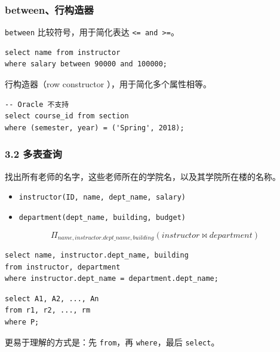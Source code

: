 \documentclass[aspectratio=169, 14pt]{beamer}
\begin{document}
\begin{frame}[fragile]
    \frametitle{between、行构造器}
    \texttt{between} 比较符号，用于简化表达 \texttt{<= and >=}。
\begin{verbatim}    
select name from instructor
where salary between 90000 and 100000;
\end{verbatim}
\pause
行构造器（row constructor ），用于简化多个属性相等。
\begin{verbatim}    
-- Oracle 不支持
select course_id from section
where (semester, year) = ('Spring', 2018);
\end{verbatim}

\end{frame}

\begin{frame}[fragile]
    \frametitle{3.2 多表查询}
    找出所有老师的名字，这些老师所在的学院名，以及其学院所在楼的名称。
\begin{itemize}
    \item  \texttt{instructor(ID, name, dept\_name, salary)}
    \item \texttt{department(dept\_name, building, budget)}
\end{itemize}
\[\Pi_{name, instructor.dept\_name, building}(instructor \Join department)\]    

\begin{verbatim} 
select name, instructor.dept_name, building 
from instructor, department
where instructor.dept_name = department.dept_name;
\end{verbatim}

\end{frame}

\begin{frame}[fragile]
    \begin{verbatim} 
select A1, A2, ..., An
from r1, r2, ..., rm
where P;
    \end{verbatim}
    更易于理解的方式是：先 \texttt{from}，再 \texttt{where}，最后 \texttt{select}。
\end{frame}
\end{document}
